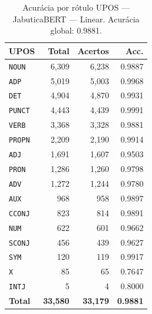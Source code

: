 \begin{table}[ht]
\centering
\footnotesize
\begin{tabular}{lrrr}
\toprule
\textbf{UPOS} & \textbf{Total} & \textbf{Acertos} & \textbf{Acc.} \\
\midrule
\texttt{NOUN} & 6,309 & 6,238 & 0.9887 \\
\texttt{ADP} & 5,019 & 5,003 & 0.9968 \\
\texttt{DET} & 4,904 & 4,870 & 0.9931 \\
\texttt{PUNCT} & 4,443 & 4,439 & 0.9991 \\
\texttt{VERB} & 3,368 & 3,328 & 0.9881 \\
\texttt{PROPN} & 2,209 & 2,190 & 0.9914 \\
\texttt{ADJ} & 1,691 & 1,607 & 0.9503 \\
\texttt{PRON} & 1,286 & 1,260 & 0.9798 \\
\texttt{ADV} & 1,272 & 1,244 & 0.9780 \\
\texttt{AUX} & 968 & 958 & 0.9897 \\
\texttt{CCONJ} & 823 & 814 & 0.9891 \\
\texttt{NUM} & 622 & 601 & 0.9662 \\
\texttt{SCONJ} & 456 & 439 & 0.9627 \\
\texttt{SYM} & 120 & 119 & 0.9917 \\
\texttt{X} & 85 & 65 & 0.7647 \\
\texttt{INTJ} & 5 & 4 & 0.8000 \\
\midrule
\textbf{Total} & \textbf{33,580} & \textbf{33,179} & \textbf{0.9881} \\
\bottomrule
\end{tabular}
\caption{Acurácia por rótulo UPOS — JabuticaBERT — Linear. Acurácia global: 0.9881.}
\label{tab:upos-acc-predict-test-df-jabuticabert-linear}
\end{table}


